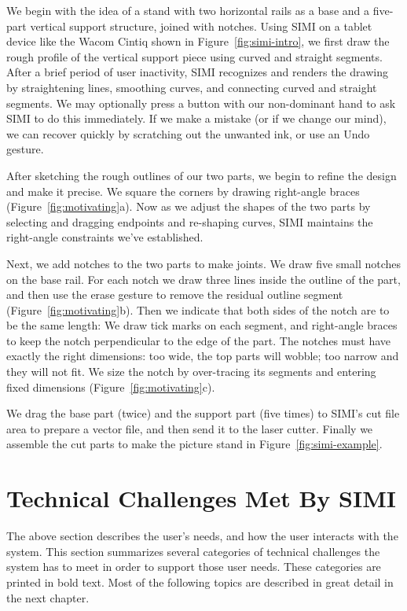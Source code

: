 We begin with the idea of a stand with two horizontal rails as a base
and a five-part vertical support structure, joined with notches. Using
SIMI on a tablet device like the Wacom Cintiq shown in
Figure~\ref{fig:simi-intro}, we first draw the rough profile of the
vertical support piece using curved and straight segments. After a
brief period of user inactivity, SIMI recognizes and renders the
drawing by straightening lines, smoothing curves, and connecting
curved and straight segments. We may optionally press a button with
our non-dominant hand to ask SIMI to do this immediately. If we make a
mistake (or if we change our mind), we can recover quickly by
scratching out the unwanted ink, or use an Undo gesture.

After sketching the rough outlines of our two parts, we begin to
refine the design and make it precise.  We square the corners by
drawing right-angle braces (Figure~\ref{fig:motivating}a).  Now as we
adjust the shapes of the two parts by selecting and dragging endpoints
and re-shaping curves, SIMI maintains the right-angle constraints
we've established.
 
Next, we add notches to the two parts to make joints. We draw five
small notches on the base rail. For each notch we draw three lines
inside the outline of the part, and then use the erase gesture to
remove the residual outline segment (Figure~\ref{fig:motivating}b).
Then we indicate that both sides of the notch are to be the same
length: We draw tick marks on each segment, and right-angle braces to
keep the notch perpendicular to the edge of the part. The notches must
have exactly the right dimensions: too wide, the top parts will
wobble; too narrow and they will not fit. We size the notch by
over-tracing its segments and entering fixed dimensions
(Figure~\ref{fig:motivating}c).
 
We drag the base part (twice) and the support part (five times) to
SIMI's cut file area to prepare a vector file, and then send it to the
laser cutter. Finally we assemble the cut parts to make the picture
stand in Figure~\ref{fig:simi-example}.



\section{Technical Challenges Met By SIMI}

The above section describes the user's needs, and how the user
interacts with the system. This section summarizes several categories
of technical challenges the system has to meet in order to support
those user needs. These categories are printed in bold text. Most of
the following topics are described in great detail in the next
chapter.

